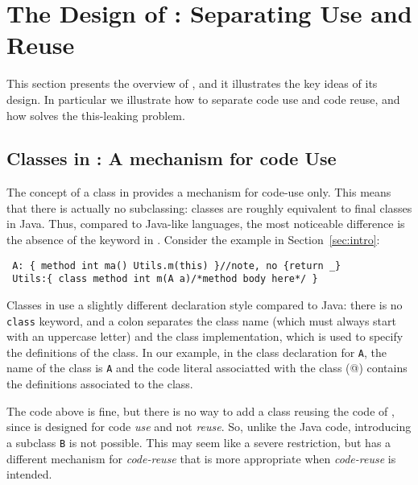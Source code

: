 \saveSpace\saveSpace\saveSpace
\section{The Design of \name: Separating Use and Reuse}\label{sec:separate}
\saveSpace\saveSpace\saveSpace
This section presents the overview of \name, and it illustrates the
key ideas of its design. In particular we illustrate how to separate code use and 
code reuse, and how \name solves the this-leaking problem.

\saveSpace\saveSpace
\subsection{Classes in \name: A mechanism for code Use}
\saveSpace
The concept of a class in \name provides a mechanism for code-use
only. This means that there is actually no subclassing:
classes are roughly equivalent to final classes in Java.  Thus,
compared to Java-like languages, the most noticeable difference is the
absence of the \Q@extends@ keyword in \name. 
Consider the example in Section~\ref{sec:intro}:
\saveSpace
\begin{lstlisting}
 A: { method int ma() Utils.m(this) }//note, no {return _}
 Utils:{ class method int m(A a)/*method body here*/ }
\end{lstlisting} 
\saveSpace
\noindent Classes in \name use a slightly different declaration style compared
to Java: there is no \lstinline{class} keyword, and a colon separates the class name (which must always start with
an uppercase letter) and the class implementation, which is used to specify the
definitions of the class. In our example, in the class declaration
for \lstinline{A}, the name of the class is \lstinline{A} and the code 
literal associatted with the class (@) contains the definitions associated to the
class.


The \name code above is fine, but there is no way to add a class 
\Q@B@ reusing the code of \Q@A@, since
\Q@A@ is designed for code \emph{use} and not \emph{reuse}. So, unlike
the Java code, introducing a subclass
\lstinline{B} is not possible. This may seem like a severe restriction, but
\name has a different mechanism for \emph{code-reuse} that 
is more appropriate when \emph{code-reuse} is intended. 

